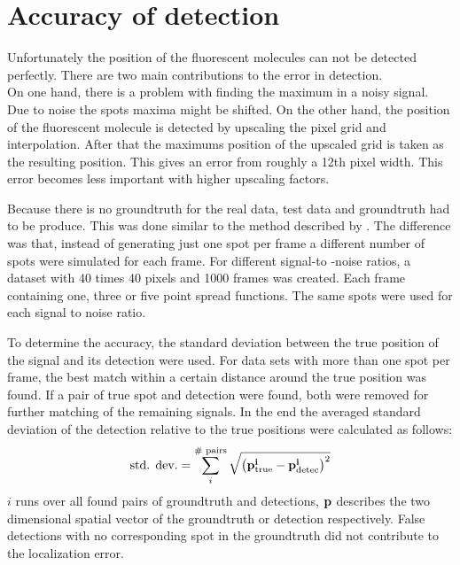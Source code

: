 \section{Accuracy of detection}
Unfortunately the position of the fluorescent molecules can not be detected
perfectly. There are two main contributions to the error in detection.\\
On one hand, there is a problem with finding the maximum in a noisy signal. Due to
noise the spots maxima might be shifted.\newline
On the other hand, the position of the fluorescent molecule is detected by upscaling the pixel grid and interpolation.
After that the maximums position of the upscaled grid is taken as the resulting
position. This gives an error from roughly a 12th pixel width. This error becomes less important with higher upscaling factors.\newline

Because there is no groundtruth for the real data, test data and groundtruth had to be produce. This was done similar to the method described by \cite{simulated}. The difference was that, instead of generating just one spot per frame a different number of spots were simulated for each frame. For different signal-to -noise ratios, a dataset with 40 times 40 pixels and 1000 frames was created. Each frame containing one, three or five point spread functions. The same spots were used for each signal to noise ratio.\newline

To determine the accuracy, the standard deviation between the true position of the signal and its detection were used. For data sets with more than one spot per frame, the best match within a certain distance around the true position was found. If a pair of true spot and detection were found, both were removed for further matching of the remaining signals. In the end the averaged standard deviation of the detection relative to the true positions were calculated as follows:
\begin{align}
	\text{std. dev.} = \sum_i^{\#\text{ pairs}} \sqrt{\left(\bf{p}_{\text{true}}^i - \bf{p}_{\text{detec}}^i\right)^2}
\end{align}
$i$ runs over all found pairs of groundtruth and detections, $\bf{p}$ describes the two dimensional spatial vector of the groundtruth or detection respectively. False detections with no corresponding spot in the groundtruth did not contribute to the localization error.\newline

